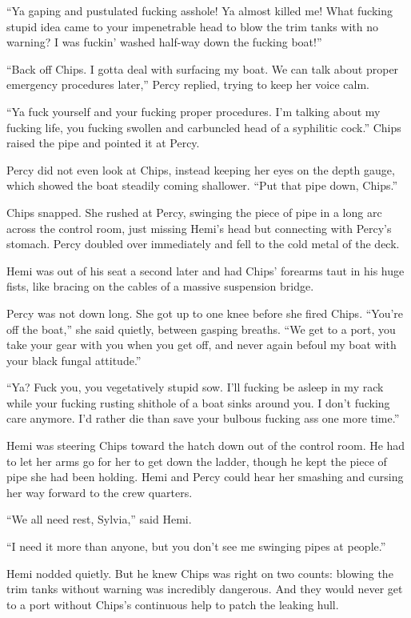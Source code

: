 \documentclass[
]{scrbook}
\begin{document}
``Ya gaping and pustulated fucking asshole! Ya almost killed me! What
fucking stupid idea came to your impenetrable head to blow the trim
tanks with no warning? I was fuckin' washed half-way down the fucking
boat!''

``Back off Chips. I gotta deal with surfacing my boat. We can talk about
proper emergency procedures later,'' Percy replied, trying to keep her
voice calm.

``Ya fuck yourself and your fucking proper procedures. I'm talking about
my fucking life, you fucking swollen and carbuncled head of a syphilitic
cock.'' Chips raised the pipe and pointed it at Percy.

Percy did not even look at Chips, instead keeping her eyes on the depth
gauge, which showed the boat steadily coming shallower. ``Put that pipe
down, Chips.''

Chips snapped. She rushed at Percy, swinging the piece of pipe in a long
arc across the control room, just missing Hemi's head but connecting
with Percy's stomach. Percy doubled over immediately and fell to the
cold metal of the deck.

Hemi was out of his seat a second later and had Chips' forearms taut in
his huge fists, like bracing on the cables of a massive suspension
bridge.

Percy was not down long. She got up to one knee before she fired Chips.
``You're off the boat,'' she said quietly, between gasping breaths. ``We
get to a port, you take your gear with you when you get off, and never
again befoul my boat with your black fungal attitude.''

``Ya? Fuck you, you vegetatively stupid sow. I'll fucking be asleep in
my rack while your fucking rusting shithole of a boat sinks around you.
I don't fucking care anymore. I'd rather die than save your bulbous
fucking ass one more time.''

Hemi was steering Chips toward the hatch down out of the control room.
He had to let her arms go for her to get down the ladder, though he kept
the piece of pipe she had been holding. Hemi and Percy could hear her
smashing and cursing her way forward to the crew quarters.

``We all need rest, Sylvia,'' said Hemi.

``I need it more than anyone, but you don't see me swinging pipes at
people.''

Hemi nodded quietly. But he knew Chips was right on two counts: blowing
the trim tanks without warning was incredibly dangerous. And they would
never get to a port without Chips's continuous help to patch the leaking
hull.
\end{document}
